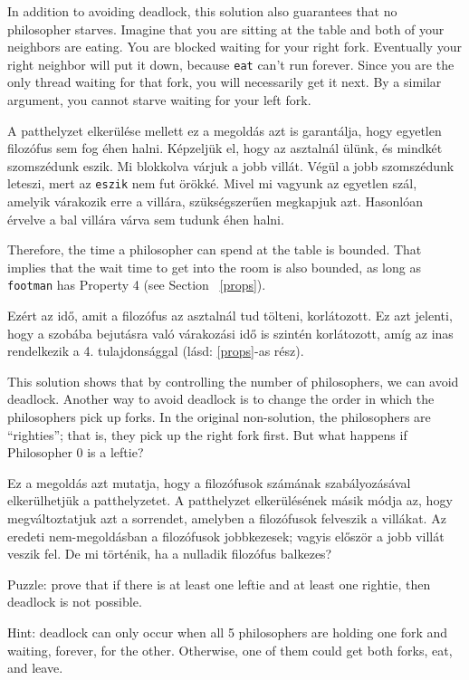 \documentclass{book}
\begin{document}
In addition to avoiding deadlock, this solution also guarantees that
no philosopher starves.
Imagine that you
are sitting at the table and both of your neighbors are eating.  You
are blocked waiting for your right fork.  Eventually your right
neighbor will put it down, because {\tt eat} can't run forever.  Since
you are the only thread waiting for that fork, you will necessarily
get it next.  By a similar argument, you cannot starve waiting for
your left fork.

A patthelyzet elkerülése mellett ez a megoldás azt is garantálja,
hogy egyetlen filozófus sem fog éhen halni. Képzeljük el, hogy
az asztalnál ülünk, és mindkét szomszédunk eszik. Mi blokkolva
várjuk a jobb villát. Végül a jobb szomszédunk leteszi, mert az
{\tt eszik} nem fut örökké. Mivel mi vagyunk az egyetlen szál, amelyik
várakozik erre a villára, szükségszerűen megkapjuk azt. Hasonlóan
érvelve a bal villára várva sem tudunk éhen halni.

Therefore, the time a philosopher can spend at the table is bounded.
That implies that the wait time to get into the room is also bounded,
as long as {\tt footman} has Property 4 (see Section ~\ref{props}).

Ezért az idő, amit a filozófus az asztalnál tud tölteni, korlátozott.
Ez azt jelenti, hogy a szobába bejutásra való várakozási idő is
szintén korlátozott, amíg az inas rendelkezik a 4. tulajdonsággal (lásd: \ref{props}-as rész).

This solution shows that
by controlling the number of philosophers, we can avoid deadlock.
Another way to avoid deadlock is to change the order in which the
philosophers pick up forks.  In the original non-solution, the
philosophers are ``righties''; that is, they pick up the right fork
first.  But what happens if Philosopher 0 is a leftie?

Ez a megoldás azt mutatja, hogy a filozófusok számának szabályozásával
elkerülhetjük a patthelyzetet. A patthelyzet elkerülésének másik módja az,
hogy megváltoztatjuk azt a sorrendet, amelyben a filozófusok felveszik
a villákat. Az eredeti nem-megoldásban a filozófusok jobbkezesek;
vagyis először a jobb villát veszik fel. De mi történik, ha a nulladik
filozófus balkezes?

Puzzle: prove that if there is at least one leftie and at least one
rightie, then deadlock is not possible.

Hint: deadlock can only occur when all 5 philosophers are holding
one fork and waiting, forever, for the other.  Otherwise, one of
them could get both forks, eat, and leave.
\end{document}

